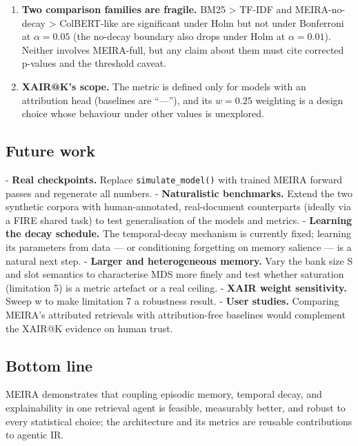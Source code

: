 \begin{enumerate}
  \item \textbf{Two comparison families are fragile.} BM25 > TF-IDF and MEIRA-no-decay > ColBERT-like are significant under Holm but not under Bonferroni at $\alpha = 0.05$ (the no-decay boundary also drops under Holm at $\alpha = 0.01$). Neither involves MEIRA-full, but any claim about them must cite corrected p-values and the threshold caveat.

  \item \textbf{XAIR@K's scope.} The metric is defined only for models with an attribution head (baselines are ``---''), and its $w = 0.25$ weighting is a design choice whose behaviour under other values is unexplored.

\end{enumerate}

\subsection{Future work}
\label{sec:concl-future}

- \textbf{Real checkpoints.} Replace \texttt{simulate\_model()} with trained MEIRA forward passes and regenerate all numbers. - \textbf{Naturalistic benchmarks.} Extend the two synthetic corpora with human-annotated, real-document counterparts (ideally via a FIRE shared task) to test generalisation of the models and metrics. - \textbf{Learning the decay schedule.} The temporal-decay mechanism is currently fixed; learning its parameters from data --- or conditioning forgetting on memory salience --- is a natural next step. - \textbf{Larger and heterogeneous memory.} Vary the bank size S and slot semantics to characterise MDS more finely and test whether saturation (limitation 5) is a metric artefact or a real ceiling. - \textbf{XAIR weight sensitivity.} Sweep w to make limitation 7 a robustness result. - \textbf{User studies.} Comparing MEIRA's attributed retrievals with attribution-free baselines would complement the XAIR@K evidence on human trust.

\subsection{Bottom line}
\label{sec:concl-bottomline}

MEIRA demonstrates that coupling episodic memory, temporal decay, and explainability in one retrieval agent is feasible, measurably better, and robust to every statistical choice; the architecture and its metrics are reusable contributions to agentic IR.

